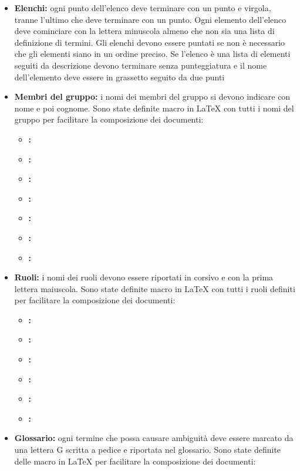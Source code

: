 \documentclass[12pt,a4paper]{article}
\begin{document}
\begin{itemize}
	\item \textbf{Elenchi:} ogni punto dell'elenco deve terminare con un punto e virgola, tranne l'ultimo che deve terminare con un punto. Ogni elemento dell'elenco deve cominciare con la lettera minuscola almeno che non sia una lista di definizione di termini. Gli elenchi devono essere puntati se non è necessario che gli elementi siano in un ordine preciso. Se l'elenco è una lista di elementi seguiti da descrizione devono terminare senza punteggiatura e il nome dell'elemento deve essere in grassetto seguito da due punti
	\item \textbf{Membri del gruppo:} i nomi dei membri del gruppo si devono indicare con nome e poi cognome. Sono state definite macro in \LaTeX{} con tutti i nomi del gruppo per facilitare la composizione dei documenti:
	\begin{itemize}
		\item \textbf{\AVI:} 
		\item \textbf{\AVE:} 
		\item \textbf{\NDC:} 
		\item \textbf{\IB:} 
		\item \textbf{\WS:} 
		\item \textbf{\TP:} 
		\item \textbf{\AB:} 
	\end{itemize}
	\item \textbf{Ruoli:} i nomi dei ruoli devono essere riportati in corsivo e con la prima lettera maiuscola. Sono state definite macro in \LaTeX{} con tutti i ruoli definiti per facilitare la composizione dei documenti:
	\begin{itemize}
		\item \textbf{\AM:} 
		\item \textbf{\AN:} 
		\item \textbf{\PG:} 
		\item \textbf{\PR:} 
		\item \textbf{\VR:} 
		\item \textbf{\RE:} 
	\end{itemize}
	\item \textbf{Glossario:} ogni termine che possa causare ambiguità deve essere marcato da una lettera G scritta a pedice e riportata nel glossario. Sono state definite delle macro in \LaTeX{} per facilitare la composizione dei documenti:

\end{itemize}
\end{document}
